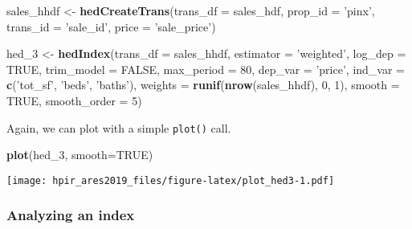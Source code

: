 \documentclass[]{article}
\newenvironment{Shaded}{\begin{snugshade}}{\end{snugshade}}
\newcommand{\KeywordTok}[1]{\textcolor[rgb]{0.13,0.29,0.53}{\textbf{#1}}}
\newcommand{\DataTypeTok}[1]{\textcolor[rgb]{0.13,0.29,0.53}{#1}}
\newcommand{\DecValTok}[1]{\textcolor[rgb]{0.00,0.00,0.81}{#1}}
\newcommand{\StringTok}[1]{\textcolor[rgb]{0.31,0.60,0.02}{#1}}
\newcommand{\OtherTok}[1]{\textcolor[rgb]{0.56,0.35,0.01}{#1}}
\newcommand{\NormalTok}[1]{#1}
\begin{document}
\begin{Shaded}
\begin{Highlighting}[]
\NormalTok{  sales_hhdf <-}\StringTok{ }\KeywordTok{hedCreateTrans}\NormalTok{(}\DataTypeTok{trans_df =}\NormalTok{ sales_hdf,}
                               \DataTypeTok{prop_id =} \StringTok{'pinx'}\NormalTok{,}
                               \DataTypeTok{trans_id =} \StringTok{'sale_id'}\NormalTok{,}
                               \DataTypeTok{price =} \StringTok{'sale_price'}\NormalTok{)}
\end{Highlighting}
\end{Shaded}

\begin{Shaded}
\begin{Highlighting}[]
\NormalTok{  hed_}\DecValTok{3}\NormalTok{ <-}\StringTok{ }\KeywordTok{hedIndex}\NormalTok{(}\DataTypeTok{trans_df =}\NormalTok{ sales_hhdf,}
                    \DataTypeTok{estimator =} \StringTok{'weighted'}\NormalTok{,}
                    \DataTypeTok{log_dep =} \OtherTok{TRUE}\NormalTok{,}
                    \DataTypeTok{trim_model =} \OtherTok{FALSE}\NormalTok{,}
                    \DataTypeTok{max_period =} \DecValTok{80}\NormalTok{,}
                    \DataTypeTok{dep_var =} \StringTok{'price'}\NormalTok{,}
                    \DataTypeTok{ind_var =} \KeywordTok{c}\NormalTok{(}\StringTok{'tot_sf'}\NormalTok{, }\StringTok{'beds'}\NormalTok{, }\StringTok{'baths'}\NormalTok{),}
                    \DataTypeTok{weights =} \KeywordTok{runif}\NormalTok{(}\KeywordTok{nrow}\NormalTok{(sales_hhdf), }\DecValTok{0}\NormalTok{, }\DecValTok{1}\NormalTok{),}
                    \DataTypeTok{smooth =} \OtherTok{TRUE}\NormalTok{,}
                    \DataTypeTok{smooth_order =} \DecValTok{5}\NormalTok{)}
\end{Highlighting}
\end{Shaded}

Again, we can plot with a simple \texttt{plot()} call.

\begin{Shaded}
\begin{Highlighting}[]
  \KeywordTok{plot}\NormalTok{(hed_}\DecValTok{3}\NormalTok{, }\DataTypeTok{smooth=}\OtherTok{TRUE}\NormalTok{)}
\end{Highlighting}
\end{Shaded}

\texttt{[image: hpir\_ares2019\_files/figure-latex/plot\_hed3-1.pdf]}

\subsubsection{Analyzing an index}\label{analyzing-an-index}
\end{document}
